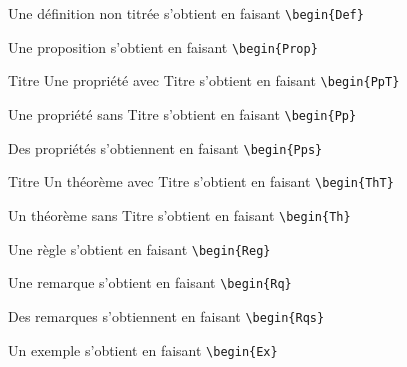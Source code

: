 \documentclass[a4paper,dvipsnames]{article}
\begin{document}
\begin{Def}
Une définition non titrée s'obtient en faisant \verb|\begin{Def}|
\end{Def}

\begin{Prop}
Une proposition s'obtient en faisant \verb|\begin{Prop}|
\end{Prop}

\begin{PpT}{Titre}
Une propriété avec Titre s'obtient en faisant \verb|\begin{PpT}|
\end{PpT}

\begin{Pp}
Une propriété sans Titre s'obtient en faisant \verb|\begin{Pp}|
\end{Pp}

\begin{Pps}
Des propriétés s'obtiennent en faisant \verb|\begin{Pps}|
\end{Pps}

\begin{ThT}{Titre}
Un théorème avec Titre s'obtient en faisant \verb|\begin{ThT}|
\end{ThT}

\begin{Th}
Un théorème sans Titre s'obtient en faisant \verb|\begin{Th}|
\end{Th}

\begin{Reg}
Une règle s'obtient en faisant \verb|\begin{Reg}|
\end{Reg}

\begin{Rq}
Une remarque s'obtient en faisant \verb|\begin{Rq}|
\end{Rq}

\begin{Rqs}
Des remarques s'obtiennent en faisant \verb|\begin{Rqs}|
\end{Rqs}

\begin{Ex}
Un exemple s'obtient en faisant \verb|\begin{Ex}|
\end{Ex}
\end{document}
